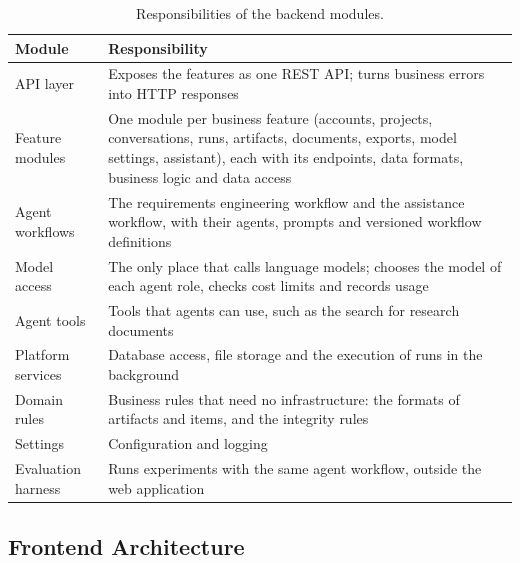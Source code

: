 \begin{table}[H]
    \centering
    \caption{Responsibilities of the backend modules.}
    \label{tab:sd-backend-modules}
    \begin{tabularx}{\linewidth}{|l|X|}
        \hline
        \textbf{Module} & \textbf{Responsibility} \\
        \hline
        API layer & Exposes the features as one REST API; turns business errors into HTTP responses \\
        Feature modules & One module per business feature (accounts, projects, conversations, runs, artifacts, documents, exports, model settings, assistant), each with its endpoints, data formats, business logic and data access \\
        Agent workflows & The requirements engineering workflow and the assistance workflow, with their agents, prompts and versioned workflow definitions \\
        Model access & The only place that calls language models; chooses the model of each agent role, checks cost limits and records usage \\
        Agent tools & Tools that agents can use, such as the search for research documents \\
        Platform services & Database access, file storage and the execution of runs in the background \\
        Domain rules & Business rules that need no infrastructure: the formats of artifacts and items, and the integrity rules \\
        Settings & Configuration and logging \\
        Evaluation harness & Runs experiments with the same agent workflow, outside the web application \\
        \hline
    \end{tabularx}
\end{table}

\subsection{Frontend Architecture}
\label{sec:sd-frontend}

